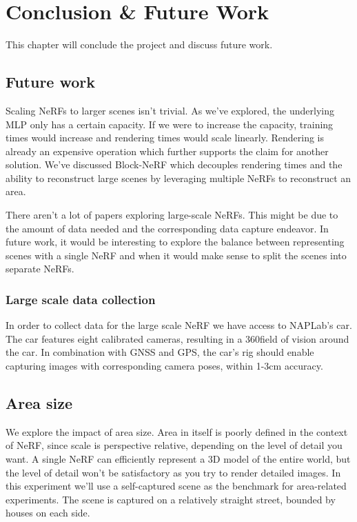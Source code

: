 \chapter{Conclusion & Future Work}
This chapter will conclude the project and discuss future work.




\section{Future work}
Scaling NeRFs to larger scenes isn't trivial. As we've explored, the underlying MLP only has a certain capacity. If we were to increase the capacity, training times would increase and rendering times would scale linearly. Rendering is already an expensive operation which further supports the claim for another solution. We've discussed Block-NeRF which decouples rendering times and the ability to reconstruct large scenes by leveraging multiple NeRFs to reconstruct an area.

There aren't a lot of papers exploring large-scale NeRFs. This might be due to the amount of data needed and the corresponding data capture endeavor. In future work, it would be interesting to explore the balance between representing scenes with a single NeRF and when it would make sense to split the scenes into separate NeRFs.

\subsection{Large scale data collection}
In order to collect data for the large scale NeRF we have access to NAPLab's car. The car features eight calibrated cameras, resulting in a 360\deg field of vision around the car. In combination with GNSS and GPS, the car's rig should enable capturing images with corresponding camera poses, within 1-3cm accuracy.

\section{Area size}
We explore the impact of area size. Area in itself is poorly defined in the context of NeRF, since scale is perspective relative, depending on the level of detail you want. A single NeRF can efficiently represent a 3D model of the entire world, but the level of detail won't be satisfactory as you try to render detailed images. In this experiment we'll use a self-captured scene as the benchmark for area-related experiments. The scene \cite{data:streetview} is captured on a relatively straight street, bounded by houses on each side. 
